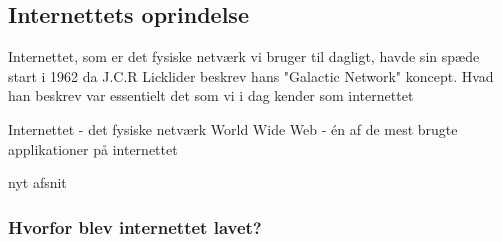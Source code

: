 \subsection{Internettets oprindelse}
Internettet, som er det fysiske netværk vi bruger til dagligt, havde sin spæde start i 1962 da J.C.R Licklider beskrev hans "Galactic Network" koncept. Hvad han beskrev var essentielt det som vi i dag kender som internettet
\newline

Internettet - det fysiske netværk\newline
World Wide Web - én af de mest brugte applikationer på internettet

nyt afsnit
\subsubsection{Hvorfor blev internettet lavet?}